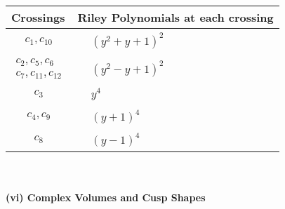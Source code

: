 \documentclass[1p]{elsarticle_modified}
\theoremstyle{definition}
\begin{document}
\begin{tabular}{m{50pt}|m{274pt}}
Crossings & \hspace{64pt}Riley Polynomials at each crossing \\
\hline $$\begin{aligned}c_{1},c_{10}\end{aligned}$$&$\begin{aligned}
&(y^2+y+1)^2
\end{aligned}$\\
\hline $$\begin{aligned}c_{2},c_{5},c_{6}\\c_{7},c_{11},c_{12}\end{aligned}$$&$\begin{aligned}
&(y^2- y+1)^2
\end{aligned}$\\
\hline $$\begin{aligned}c_{3}\end{aligned}$$&$\begin{aligned}
&y^4
\end{aligned}$\\
\hline $$\begin{aligned}c_{4},c_{9}\end{aligned}$$&$\begin{aligned}
&(y+1)^4
\end{aligned}$\\
\hline $$\begin{aligned}c_{8}\end{aligned}$$&$\begin{aligned}
&(y-1)^4
\end{aligned}$\\
\hline
\end{tabular}\\~\\
\newpage\flushleft \textbf{(vi) Complex Volumes and Cusp Shapes}
\end{document}
